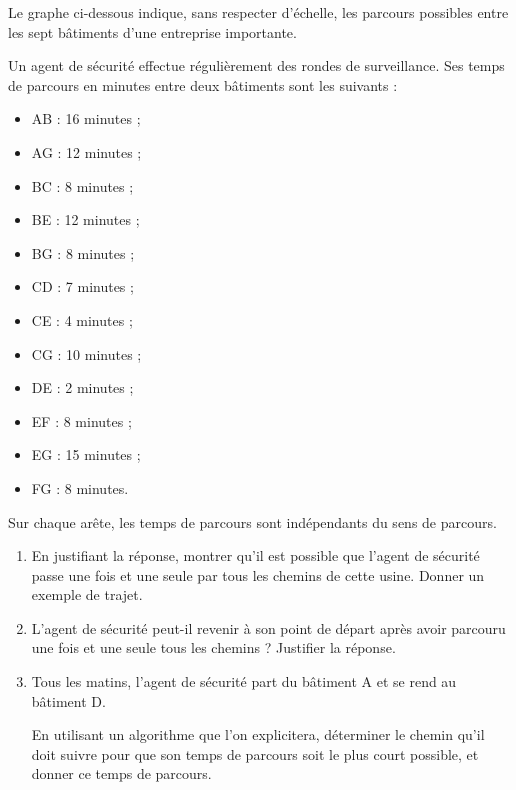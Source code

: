 \documentclass[]{prof}
\begin{document}

Le graphe ci-dessous indique, sans respecter d'échelle, les parcours possibles entre les sept bâtiments d'une entreprise importante.


\bigskip
{}


\bigskip
Un agent de sécurité effectue régulièrement des rondes de surveillance. Ses temps de parcours en minutes entre deux bâtiments sont les
suivants :

\bigskip
\begin{center}
    \begin{minipage}{0.5\textwidth}
        \begin{itemize}
        \item AB : 16 minutes ;
        \item AG : 12 minutes ;
        \item BC : 8 minutes ;
        \item BE : 12 minutes ;
        \item BG : 8 minutes ;
        \item CD : 7 minutes ;
        \item CE : 4 minutes ;
        \item CG : 10 minutes ;
        \item DE : 2 minutes ;
        \item EF : 8 minutes ;
        \item EG : 15 minutes ;
        \item FG : 8 minutes.
        \end{itemize}
    \end{minipage}
\end{center}


\bigskip
Sur chaque arête, les temps de parcours sont indépendants du sens de parcours.

\bigskip
\begin{enumerate}
\item En justifiant la réponse, montrer qu'il est possible que l'agent de sécurité passe une fois et une seule par tous les chemins de cette usine. Donner un exemple de trajet.

\item L'agent de sécurité peut-il revenir à son point de départ après avoir parcouru une fois et une seule tous les chemins ? Justifier la réponse.

\item Tous les matins, l'agent de sécurité part du bâtiment A et se rend au bâtiment D.

En utilisant un algorithme que l'on explicitera, déterminer le chemin qu'il doit suivre pour que son temps de parcours soit le plus court possible, et donner ce temps de parcours.
\end{enumerate}
\end{document}
